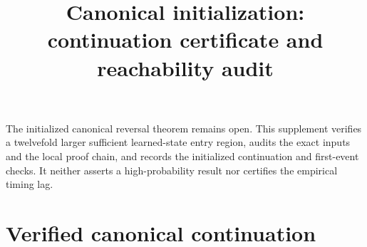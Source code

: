 \documentclass[10pt]{article}
\title{Canonical initialization: continuation certificate and reachability audit}
\author{}\date{}
\begin{document}
\maketitle
\noindent
The initialized canonical reversal theorem remains open. This supplement
verifies a twelvefold larger sufficient learned-state entry region, audits
the exact inputs and the local proof chain, and records the initialized
continuation and first-event checks. It neither asserts a high-probability
result nor certifies the empirical timing lag.
\section{Verified canonical continuation}





\end{document}

